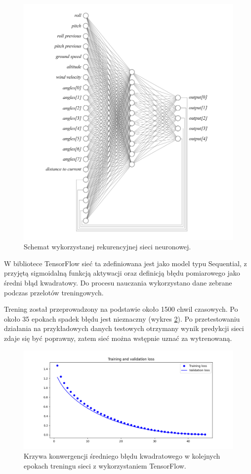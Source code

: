 \documentclass[12pt, a4paper]{article}
\begin{document}
 \begin{figure}[H]
    \centering
    \includegraphics[width=1\textwidth]{siec}
    \caption{Schemat wykorzystanej rekurencyjnej sieci neuronowej.}
    \label{fig:siec}
\end{figure}

W bibliotece TensorFlow sieć ta zdefiniowana jest jako model typu Sequential, z przyjętą sigmoidalną funkcją aktywacji oraz definicją błędu pomiarowego jako średni błąd kwadratowy. Do procesu nauczania wykorzystano dane zebrane podczas przelotów treningowych.

Trening został przeprowadzony na podstawie około 1500 chwil czasowych. Po około 35 epokach spadek błędu jest nieznaczny (wykres \ref{fig:tren1}). Po przetestowaniu działania na przykładowych danych testowych otrzymany wynik predykcji sieci zdaje się być poprawny, zatem sieć można wstępnie uznać za wytrenowaną.

 \begin{figure}[H]
    \centering
    \includegraphics[width=1\textwidth]{tfloss}
    \caption{Krzywa konwergencji średniego błędu kwadratowego w kolejnych epokach treningu sieci z wykorzystaniem TensorFlow.}
    \label{fig:tren1}
\end{figure}
\end{document}
